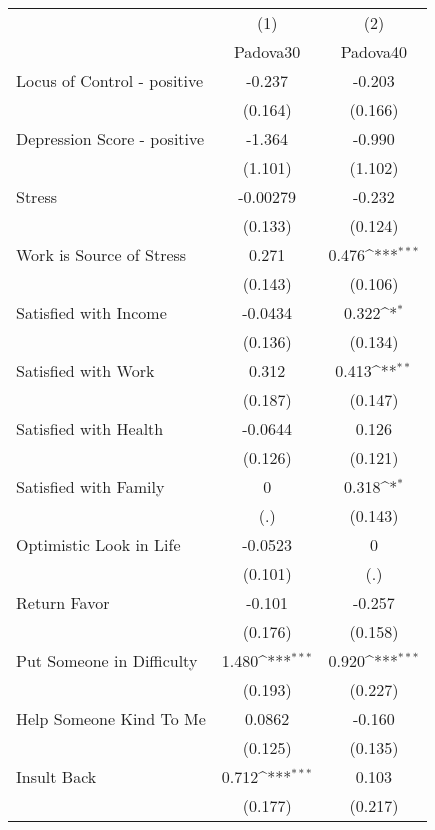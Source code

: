 {
\def\sym#1{\ifmmode^{#1}\else\(^{#1}\)\fi}
\begin{tabular}{l*{2}{c}}
\toprule
            &\multicolumn{1}{c}{(1)}&\multicolumn{1}{c}{(2)}\\
            &\multicolumn{1}{c}{Padova30}&\multicolumn{1}{c}{Padova40}\\
\midrule
Locus of Control - positive&      -0.237         &      -0.203         \\
            &     (0.164)         &     (0.166)         \\
\addlinespace
Depression Score - positive&      -1.364         &      -0.990         \\
            &     (1.101)         &     (1.102)         \\
\addlinespace
Stress      &    -0.00279         &      -0.232         \\
            &     (0.133)         &     (0.124)         \\
\addlinespace
Work is Source of Stress&       0.271         &       0.476\sym{***}\\
            &     (0.143)         &     (0.106)         \\
\addlinespace
Satisfied with Income&     -0.0434         &       0.322\sym{*}  \\
            &     (0.136)         &     (0.134)         \\
\addlinespace
Satisfied with Work&       0.312         &       0.413\sym{**} \\
            &     (0.187)         &     (0.147)         \\
\addlinespace
Satisfied with Health&     -0.0644         &       0.126         \\
            &     (0.126)         &     (0.121)         \\
\addlinespace
Satisfied with Family&           0         &       0.318\sym{*}  \\
            &         (.)         &     (0.143)         \\
\addlinespace
Optimistic Look in Life&     -0.0523         &           0         \\
            &     (0.101)         &         (.)         \\
\addlinespace
Return Favor&      -0.101         &      -0.257         \\
            &     (0.176)         &     (0.158)         \\
\addlinespace
Put Someone in Difficulty&       1.480\sym{***}&       0.920\sym{***}\\
            &     (0.193)         &     (0.227)         \\
\addlinespace
Help Someone Kind To Me&      0.0862         &      -0.160         \\
            &     (0.125)         &     (0.135)         \\
\addlinespace
Insult Back &       0.712\sym{***}&       0.103         \\
            &     (0.177)         &     (0.217)         \\
\bottomrule
\end{tabular}
}

